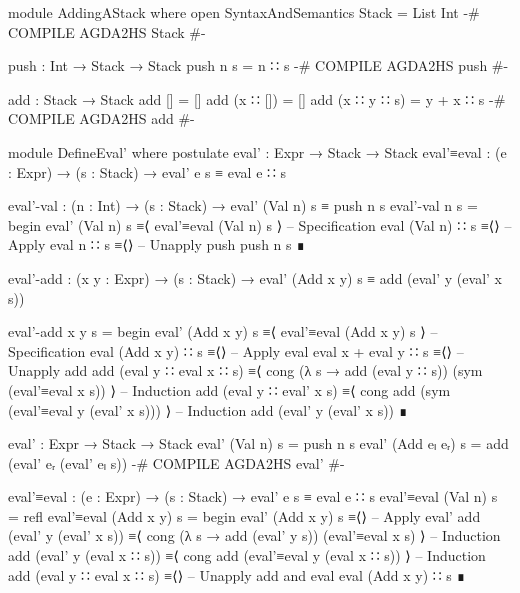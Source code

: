 \documentclass{article}
\begin{document}
\begin{code}
module AddingAStack where
  open SyntaxAndSemantics
  Stack = List Int
  {-# COMPILE AGDA2HS Stack #-}

  push : Int → Stack → Stack
  push n s = n ∷ s
  {-# COMPILE AGDA2HS push #-}

  add : Stack → Stack
  add [] = []
  add (x ∷ []) = []
  add (x ∷ y ∷ s) = y + x ∷ s
  {-# COMPILE AGDA2HS add #-}

  module DefineEval' where
    postulate
      eval' : Expr → Stack → Stack
      eval'≡eval : (e : Expr) → (s : Stack) → eval' e s ≡ eval e ∷ s

    eval'-val : (n : Int) → (s : Stack) → eval' (Val n) s ≡ push n s
    eval'-val n s =
      begin
        eval' (Val n) s
      ≡⟨ eval'≡eval (Val n) s ⟩ -- Specification
        eval (Val n) ∷ s
      ≡⟨⟩ -- Apply eval
        n ∷ s
      ≡⟨⟩ -- Unapply push
        push n s
      ∎
\end{code}
\begin{code}
    eval'-add : (x y : Expr) → (s : Stack)
      → eval' (Add x y) s ≡ add (eval' y (eval' x s))
\end{code}
\begin{code}
    eval'-add x y s =
      begin
        eval' (Add x y) s
      ≡⟨ eval'≡eval (Add x y) s ⟩ -- Specification
        eval (Add x y) ∷ s
      ≡⟨⟩ -- Apply eval
        eval x + eval y ∷ s
      ≡⟨⟩ -- Unapply add
        add (eval y ∷ eval x ∷ s)
      ≡⟨ cong (λ s → add (eval y ∷ s)) (sym (eval'≡eval x s)) ⟩ -- Induction
        add (eval y ∷ eval' x s)
      ≡⟨ cong add (sym (eval'≡eval y (eval' x s))) ⟩ -- Induction
        add (eval' y (eval' x s))
      ∎
\end{code}
\begin{code}
  eval' : Expr → Stack → Stack
  eval' (Val n) s = push n s
  eval' (Add eₗ eᵣ) s = add (eval' eᵣ (eval' eₗ s))
  {-# COMPILE AGDA2HS eval' #-}
\end{code}
\begin{code}
  eval'≡eval : (e : Expr) → (s : Stack) → eval' e s ≡ eval e ∷ s
  eval'≡eval (Val n) s = refl
  eval'≡eval (Add x y) s =
    begin
      eval' (Add x y) s
    ≡⟨⟩ -- Apply eval'
      add (eval' y (eval' x s))
    ≡⟨ cong (λ s → add (eval' y s)) (eval'≡eval x s) ⟩ -- Induction
      add (eval' y (eval x ∷ s))
    ≡⟨ cong add (eval'≡eval y (eval x ∷ s)) ⟩ -- Induction
      add (eval y ∷ eval x ∷ s)
    ≡⟨⟩ -- Unapply add and eval
      eval (Add x y) ∷ s
    ∎
\end{code}
\end{document}
